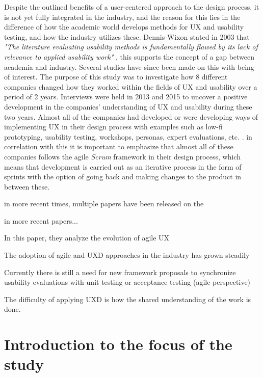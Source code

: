 \noindent
Despite the outlined benefits of a user-centered approach to the design process, it is not yet fully integrated in the industry, and the reason for this lies in the difference of how the academic world develops methods for UX and usability testing, and how the industry utilizes these. Dennis Wixon stated in 2003 that \textit{"The literature evaluating usability methods is fundamentally flawed by its lack of relevance to applied usability work"} \parencite{WEB:WixonUXindustry}, this supports the concept of a gap between academia and industry. Several studies have since been made on this with \textcite{WEB:TinaOgLarsBo} being of interest. The purpose of this study was to investigate how 8 different companies changed how they worked within the fields of UX and usability over a period of 2 years. Interviews were held in 2013 and 2015 to uncover a positive development in the companies' understanding  of UX and usability during these two years. Almost all of the companies had developed or were developing ways of implementing UX in their design process with examples such as low-fi prototyping, usability testing, workshops, personas, expert evaluations, etc. \parencite[][48]{WEB:TinaOgLarsBo}. in correlation with this it is important to emphasize that almost all of these companies follows the agile \textit{Scrum} framework in their design process, which means that development is carried out as an iterative process in the form of sprints with the option of going back and making changes to the product in between these.

in more recent times, multiple papers have been released on the 

in more recent papers...


In this paper, they analyze the evolution of agile UX

The adoption of agile and UXD approaches in the industry has grown steadily

Currently there is still a need for new framework proposals to synchronize usability evaluations with unit testing or acceptance testing (agile perspective)

The difficulty of applying UXD is how the shared understanding of the work is done.

\parencite{PDF:EvolutionofagileUXD}
\parencite{WEB:AgilityForUX}




\section{Introduction to the focus of the study}
\label{ProjectFocus}








